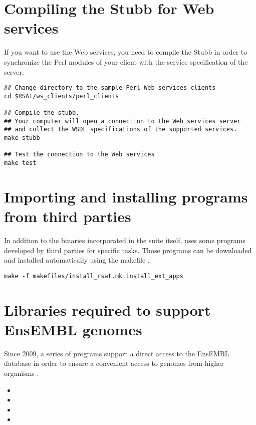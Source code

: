 \documentclass[12pt,a4paper, oneside]{scrreprt} %
\begin{document}
\section{Compiling the Stubb for Web services}

If you want to use the Web services, you need to compile the Stubb in
order to synchronize the Perl modules of your client with the service
specification of the server.


\begin{lstlisting}
## Change directory to the sample Perl Web services clients
cd $RSAT/ws_clients/perl_clients

## Compile the stubb.
## Your computer will open a connection to the Web services server 
## and collect the WSDL specifications of the supported services.
make stubb

## Test the connection to the Web services
make test
\end{lstlisting}


\section{Importing and installing programs from third parties}

In addition to the binaries incorporated in the suite itself, \RSAT
uses some programs developed by third parties for specific
tasks. Those programs can be downloaded and installed automatically
using the makefile .

\begin{lstlisting}
make -f makefiles/install_rsat.mk install_ext_apps
\end{lstlisting}


\section{Libraries required to support EnsEMBL genomes}
\label{sect:ensembl_libraries}

Since 2009, a series of \RSAT programs support a direct access to the
EnsEMBL database in order to ensure a convenient access to genomes
from higher organisms \cite{Sand:2009}.

\begin{itemize}
\item {}
\item {}
\item {} 
\item {}
\end{itemize}
\end{document}
